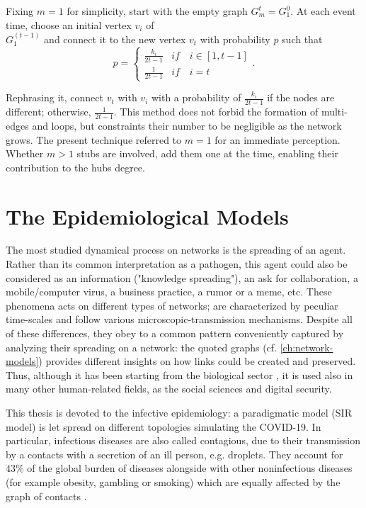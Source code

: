 \documentclass[a4paper,12pt,twoside]{book} %
\theoremstyle{definition}
\begin{document}
Fixing $m=1$ for simplicity, start with the empty graph $G_{m}^t = G_1^0$.
At each event time, choose an initial vertex $v_i$ of \\ $G_1^{(t-1)}$ and connect it to the new vertex $v_t$ with probability $p$ such that
\begin{equation}
	p =
	\begin{cases}
		\frac{k_i}{2t-1} & if \quad i \in [1,t-1] \\
		\frac{1}{2t-1} & if \quad i = t
	\end{cases}
	.
\end{equation}

Rephrasing it, connect $v_t$ with $v_i$ with a probability of $\frac{k_i}{2t-1}$ if the nodes are different; otherwise, $\frac{1}{2t-1}$. This method does not forbid the formation of multi-edges and loops, but constraints their number to be negligible as the network grows.
The present technique referred to $m=1$ for an immediate perception. Whether $m > 1$ stubs are involved, add them one at the time, enabling their contribution to the hubs degree.

\chapter{The Epidemiological Models}
\label{ch:sir-models}	
The most studied dynamical process on networks is the spreading of an agent. Rather than its common interpretation as a pathogen, this agent could also be considered as an information ("knowledge spreading"), an ask for collaboration, a mobile/computer virus, a business practice, a rumor or a meme, etc. These phenomena acts on different types of networks; are characterized by peculiar time-scales and follow various microscopic-transmission mechanisms. Despite all of these differences, they obey to a common pattern conveniently captured by analyzing their spreading on a network: the quoted graphs (cf. \autoref{ch:network-models}) provides different insights on how links could be created and preserved. Thus, although it has been starting from the biological sector \cite{VespignaniSatorras2001Epidemic}, it is used also in many other human-related fields, as the social sciences and digital security.

This thesis is devoted to the infective epidemiology: a paradigmatic model (SIR model) is let spread on different topologies simulating the COVID-19. In particular, infectious diseases are also called contagious, due to their transmission by a contacts with a secretion of an ill person, e.g. droplets. They account for $43\%$ of the global burden of diseases alongside with other noninfectious diseases (for example obesity, gambling or smoking) which are equally affected by the graph of contacts \cite{barabasi::2016networkbook}.
\end{document}
